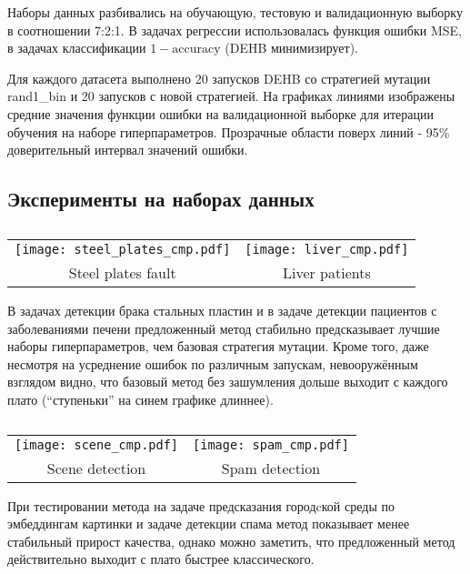 \documentclass{article}
\begin{document}
Наборы данных разбивались на обучающую, тестовую и валидационную выборку в соотношении 7:2:1. В задачах регрессии использовалась функция ошибки MSE, в задачах классификации $1 - \text{accuracy}$ (DEHB минимизирует).

Для каждого датасета выполнено 20 запусков DEHB со стратегией мутации rand1\_bin и 20 запусков с новой стратегией. На графиках линиями изображены средние значения функции ошибки на валидационной выборке для итерации обучения на наборе гиперпараметров. Прозрачные области поверх линий - 95\% доверительный интервал значений ошибки.

\subsection{Эксперименты на наборах данных}

\begin{table}[h]
    \centering
    \begin{tabular}{cc}
        \texttt{[image: steel\_plates\_cmp.pdf]}
        &
        \texttt{[image: liver\_cmp.pdf]} \\
        Steel plates fault & Liver patients
    \end{tabular}
    \label{table:datasets1}
    \caption{}
\end{table}
\par

В задачах детекции брака стальных пластин и в задаче детекции пациентов с заболеваниями печени предложенный метод стабильно предсказывает лучшие наборы гиперпараметров, чем базовая стратегия мутации. Кроме того, даже несмотря на усреднение ошибок по различным запускам, невооружённым взглядом видно, что базовый метод без зашумления дольше выходит с каждого плато (``ступеньки'' на синем графике длиннее).

\begin{table}[h]
    \centering
    \begin{tabular}{cc}
        \texttt{[image: scene\_cmp.pdf]}
        &
        \texttt{[image: spam\_cmp.pdf]} \\
        Scene detection  & Spam detection
    \end{tabular}
    \label{table:datasets2}
    \caption{}
\end{table}
\par

При тестировании метода на задаче предсказания городcкой среды по эмбеддингам картинки и задаче детекции спама метод показывает менее стабильный прирост качества, однако можно заметить, что предложенный метод действительно выходит с плато быстрее классического.
\end{document}
